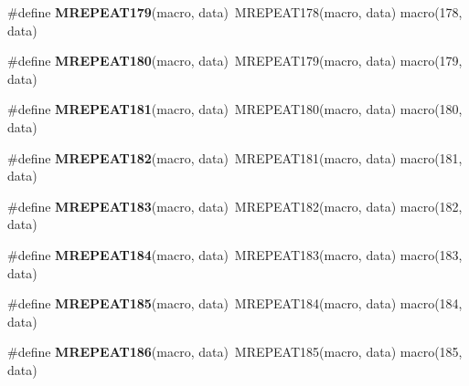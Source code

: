 \begin{DoxyCompactItemize}
\item 
\hypertarget{group__group__xmega__utils__mrepeat_ga81eff2faaafc0dc30fa1c29f7c6e33f5}{\#define {\bfseries M\-R\-E\-P\-E\-A\-T179}(macro, data)~M\-R\-E\-P\-E\-A\-T178(macro, data)   macro(178, data)}\label{group__group__xmega__utils__mrepeat_ga81eff2faaafc0dc30fa1c29f7c6e33f5}

\item 
\hypertarget{group__group__xmega__utils__mrepeat_ga131a0e131d380f253f0748364eb9cc3f}{\#define {\bfseries M\-R\-E\-P\-E\-A\-T180}(macro, data)~M\-R\-E\-P\-E\-A\-T179(macro, data)   macro(179, data)}\label{group__group__xmega__utils__mrepeat_ga131a0e131d380f253f0748364eb9cc3f}

\item 
\hypertarget{group__group__xmega__utils__mrepeat_ga2596ba634c8c3cc9001bdb16a5228933}{\#define {\bfseries M\-R\-E\-P\-E\-A\-T181}(macro, data)~M\-R\-E\-P\-E\-A\-T180(macro, data)   macro(180, data)}\label{group__group__xmega__utils__mrepeat_ga2596ba634c8c3cc9001bdb16a5228933}

\item 
\hypertarget{group__group__xmega__utils__mrepeat_ga958c679aab7f419465b7d099d790a944}{\#define {\bfseries M\-R\-E\-P\-E\-A\-T182}(macro, data)~M\-R\-E\-P\-E\-A\-T181(macro, data)   macro(181, data)}\label{group__group__xmega__utils__mrepeat_ga958c679aab7f419465b7d099d790a944}

\item 
\hypertarget{group__group__xmega__utils__mrepeat_ga413ea4db626945b91fb34b078615b02c}{\#define {\bfseries M\-R\-E\-P\-E\-A\-T183}(macro, data)~M\-R\-E\-P\-E\-A\-T182(macro, data)   macro(182, data)}\label{group__group__xmega__utils__mrepeat_ga413ea4db626945b91fb34b078615b02c}

\item 
\hypertarget{group__group__xmega__utils__mrepeat_ga7b8a834a1fbd1d3dcfa95f0d3724835f}{\#define {\bfseries M\-R\-E\-P\-E\-A\-T184}(macro, data)~M\-R\-E\-P\-E\-A\-T183(macro, data)   macro(183, data)}\label{group__group__xmega__utils__mrepeat_ga7b8a834a1fbd1d3dcfa95f0d3724835f}

\item 
\hypertarget{group__group__xmega__utils__mrepeat_ga72fd4bb3bee8d7ae45897345c0ca13d1}{\#define {\bfseries M\-R\-E\-P\-E\-A\-T185}(macro, data)~M\-R\-E\-P\-E\-A\-T184(macro, data)   macro(184, data)}\label{group__group__xmega__utils__mrepeat_ga72fd4bb3bee8d7ae45897345c0ca13d1}

\item 
\hypertarget{group__group__xmega__utils__mrepeat_gaffac3b38c0b0a12816b6620ebd99d6a9}{\#define {\bfseries M\-R\-E\-P\-E\-A\-T186}(macro, data)~M\-R\-E\-P\-E\-A\-T185(macro, data)   macro(185, data)}\label{group__group__xmega__utils__mrepeat_gaffac3b38c0b0a12816b6620ebd99d6a9}


\end{DoxyCompactItemize}
